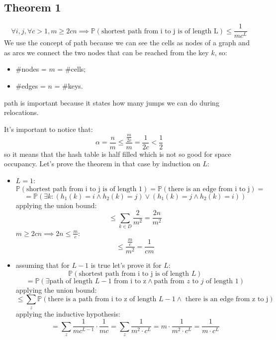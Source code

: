 \subsection{Theorem 1}
$$
    \forall i, j, \forall c > 1, m \geq 2 c n \implies \mathbb{P}(\text{shortest path from i to j is of length L}) \leq \frac{1}{mc^L}
$$
We use the concept of path because we can see the cells as nodes of a graph and as arcs we connect the two nodes that can be reached from the key $k$, so:
\begin{itemize}
    \item $\#$nodes = $m$ = $\#$cells;
    \item $\#$edges = $n$ = $\#$keys.
\end{itemize}
path is important because it states how many jumps we can do during relocations.

It's important to notice that:
$$
    \alpha = \frac{n}{m} \leq \frac{\frac{m}{2c}}{m} = \frac{1}{2c} < \frac{1}{2}
$$
so it means that the hash table is half filled which is not so good for space occupancy.
Let's prove the theorem in that case by induction on $L$:
\begin{itemize}
    \item $L=1$:
    $$
        \mathbb{P}(\text{shortest path from i to j is of length 1}) = \mathbb{P}(\text{there is an edge from i to j}) = 
    $$
    $$
        = \mathbb{P}(\exists k : (h_1(k) = i \land h_2(k) = j) \lor (h_1(k) = j \land h_2(k) = i) ) 
    $$
    applying the union bound:
    $$
        \leq \sum_{k \in D} \frac{2}{m^2} = \frac{2n}{m^2}
    $$
    $m \geq 2cn \implies 2n \leq \frac{m}{c}$:
    $$
        \leq \frac{\frac{m}{c}}{m^2} = \frac{1}{cm}
    $$

    \item assuming that for $L-1$ is true let's prove it for $L$:
    $$
        \mathbb{P}(\text{shortest path from i to j is of length }L)
    $$
    $$
        = \mathbb{P}(\exists \text{path of length $L-1$ from i to z} \land \text{path from $z$ to $j$ of length 1})
    $$
    applying the union bound:
    $$
        \leq \sum_z \mathbb{P}(\text{there is a path from i to z of length $L-1$} \land \text{ there is an edge from z to j})
    $$
    applying the inductive hypothesis:
    $$
        = \sum_z \frac{1}{mc^{L-1}} \cdot \frac{1}{mc} = \sum_z \frac{1}{m^2 \cdot c^L} = m \cdot \frac{1}{m^2 \cdot c^L} = \frac{1}{m \cdot c^L}
    $$
\end{itemize}

